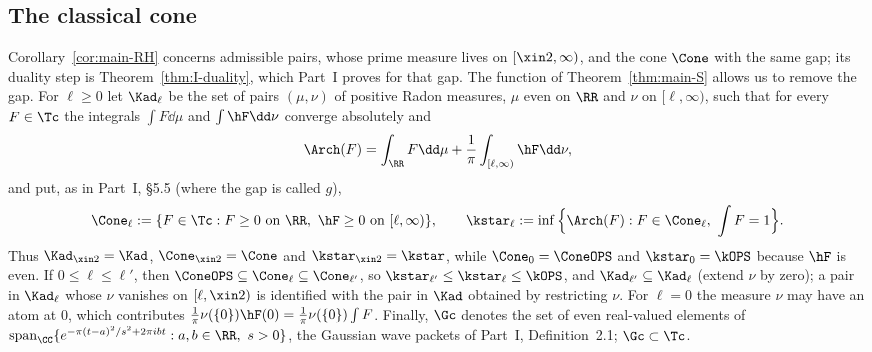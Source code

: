 \subsection*{The classical cone}

Corollary~\ref{cor:main-RH} concerns admissible pairs, whose prime measure lives on $[\xin2,\infty)$, and the cone $\Cone$ with the same gap; its
duality step is Theorem~\ref{thm:I-duality}, which Part~I proves for that gap. The function of Theorem~\ref{thm:main-S} allows us to remove the
gap. For $\ell\ge0$
let $\Kad_\ell$ be the set of pairs $(\mu,\nu)$ of positive Radon measures, $\mu$ even on $\RR$ and $\nu$ on $[\ell,\infty)$, such that for every $F\in\Tc$
the integrals $\int F\dd\mu$ and $\int\hF\dd\nu$ converge absolutely and
\[
\Arch(F)=\int_\RR F\dd\mu+\frac1\pi\int_{[\ell,\infty)}\hF\dd\nu ,
\]
and put, as in Part~I, \S5.5 (where the gap is called $g$),
\[
\Cone_\ell:=\{F\in\Tc:F\ge0\text{ on }\RR,\ \hF\ge0\text{ on }[\ell,\infty)\},\qquad
\kstar_\ell:=\inf\Big\{\Arch(F):F\in\Cone_\ell,\ \int F=1\Big\}.
\]
Thus $\Kad_{\xin2}=\Kad$, $\Cone_{\xin2}=\Cone$ and $\kstar_{\xin2}=\kstar$, while $\Cone_0=\ConeOPS$ and $\kstar_0=\kOPS$ because $\hF$ is even. If
$0\le \ell\le \ell'$, then $\ConeOPS\subseteq\Cone_\ell\subseteq\Cone_{\ell'}$, so $\kstar_{\ell'}\le\kstar_\ell\le\kOPS$, and $\Kad_{\ell'}\subseteq\Kad_\ell$ (extend $\nu$ by zero);
a pair in $\Kad_\ell$ whose $\nu$ vanishes on $[\ell,\xin2)$ is identified with the pair in $\Kad$ obtained by restricting $\nu$. For $\ell=0$ the measure $\nu$
may have an atom at $0$, which contributes $\frac1\pi\nu(\{0\})\hF(0)=\frac1\pi\nu(\{0\})\int F$. Finally, $\Gc$ denotes the set of even
real-valued elements of $\operatorname{span}_\CC\{e^{-\pi(t-a)^2/s^2+2\pi ibt}:a,b\in\RR,\ s>0\}$, the Gaussian wave packets of Part~I,
Definition~2.1; $\Gc\subset\Tc$.

